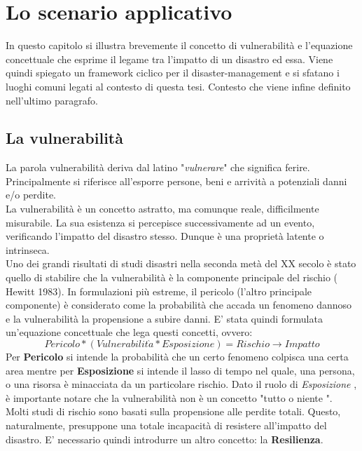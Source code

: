 \chapter{Lo scenario applicativo}
\label{scenario}
In questo capitolo si illustra brevemente il concetto di vulnerabilità e l'equazione concettuale che esprime il legame tra l'impatto di un disastro ed essa. Viene quindi spiegato un framework ciclico per il disaster-management e si sfatano i luoghi comuni legati al contesto di questa tesi. Contesto che viene infine definito nell'ultimo paragrafo.


\section{La vulnerabilità}
\label{vuln}

La parola vulnerabilità \cite{NOTE} deriva dal latino "\textit{vulnerare}" che significa ferire. Principalmente si riferisce all'esporre persone, beni e arrività a potenziali danni e/o perdite. \\
La vulnerabilità è un concetto astratto, ma comunque reale, difficilmente misurabile.  La sua esistenza si percepisce successivamente ad un evento, verificando l'impatto del disastro stesso. Dunque è una proprietà latente o intrinseca.\\
Uno dei grandi risultati di studi disastri nella seconda metà del XX secolo è stato quello di stabilire che la vulnerabilità è la componente principale del rischio ( Hewitt 1983). In formulazioni più estreme, il pericolo (l'altro principale componente) è considerato come la probabilità che accada un fenomeno dannoso e la vulnerabilità la propensione a subire danni. E' stata quindi formulata un'equazione concettuale che lega questi concetti, ovvero:
\begin{equation}
\label{eq}
Pericolo * (Vulnerabilit\grave{a} *Esposizione ) = Rischio \rightarrow Impatto
\end{equation}
\newpage
Per \textbf{Pericolo} si intende la probabilità che un certo fenomeno colpisca una certa area mentre per \textbf{Esposizione} si intende il lasso di tempo nel quale, una persona, o una risorsa è minacciata da un particolare rischio. 
Dato il ruolo di \textit{Esposizione} , è importante notare che la vulnerabilità non è un concetto "tutto o niente ". \\
Molti studi di rischio sono basati sulla propensione alle perdite totali. Questo, naturalmente, presuppone una totale incapacità di resistere all'impatto del disastro. E' necessario quindi introdurre un altro concetto: la \textbf{Resilienza}.
